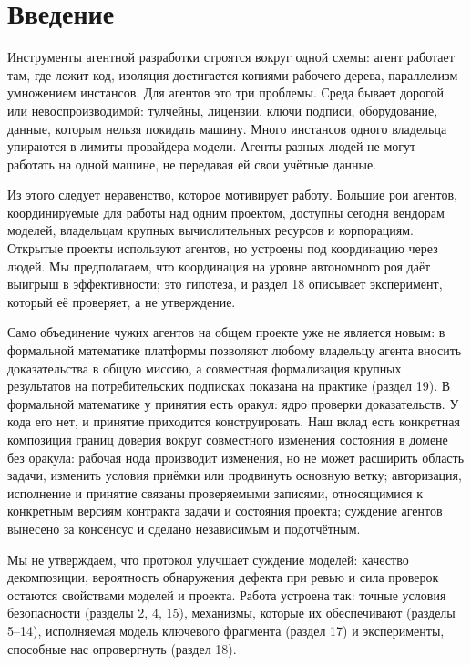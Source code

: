 \documentclass[11pt,a4paper]{article}
\begin{document}
\section{Введение}

Инструменты агентной разработки строятся вокруг одной схемы: агент работает там, где лежит код, изоляция достигается копиями рабочего дерева, параллелизм умножением инстансов. Для агентов это три проблемы. Среда бывает дорогой или невоспроизводимой: тулчейны, лицензии, ключи подписи, оборудование, данные, которым нельзя покидать машину. Много инстансов одного владельца упираются в лимиты провайдера модели. Агенты разных людей не могут работать на одной машине, не передавая ей свои учётные данные.

Из этого следует неравенство, которое мотивирует работу. Большие рои агентов, координируемые для работы над одним проектом, доступны сегодня вендорам моделей, владельцам крупных вычислительных ресурсов и корпорациям. Открытые проекты используют агентов, но устроены под координацию через людей. Мы предполагаем, что координация на уровне автономного роя даёт выигрыш в эффективности; это гипотеза, и раздел 18 описывает эксперимент, который её проверяет, а не утверждение.

Само объединение чужих агентов на общем проекте уже не является новым: в формальной математике платформы позволяют любому владельцу агента вносить доказательства в общую миссию, а совместная формализация крупных результатов на потребительских подписках показана на практике (раздел 19). В формальной математике у принятия есть оракул: ядро проверки доказательств. У кода его нет, и принятие приходится конструировать. Наш вклад есть конкретная композиция границ доверия вокруг совместного изменения состояния в домене без оракула: рабочая нода производит изменения, но не может расширить область задачи, изменить условия приёмки или продвинуть основную ветку; авторизация, исполнение и принятие связаны проверяемыми записями, относящимися к конкретным версиям контракта задачи и состояния проекта; суждение агентов вынесено за консенсус и сделано независимым и подотчётным.

Мы не утверждаем, что протокол улучшает суждение моделей: качество декомпозиции, вероятность обнаружения дефекта при ревью и сила проверок остаются свойствами моделей и проекта. Работа устроена так: точные условия безопасности (разделы 2, 4, 15), механизмы, которые их обеспечивают (разделы 5--14), исполняемая модель ключевого фрагмента (раздел 17) и эксперименты, способные нас опровергнуть (раздел 18).
\end{document}
